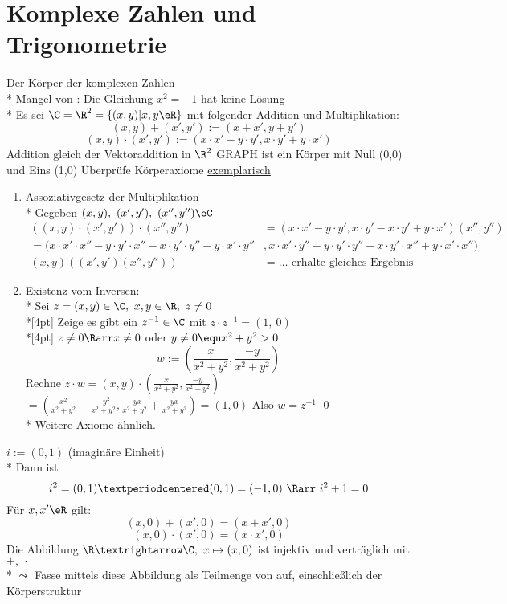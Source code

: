 \chapter{Komplexe Zahlen und Trigonometrie}
Der Körper \C{} der komplexen Zahlen\\*
Mangel von \R{}: Die Gleichung $x^2=-1$ hat keine Lösung\\*
Es sei $\C=\R^2=\{(x,y)|x,y\eR\}$ mit folgender Addition und Multiplikation:
$$(x,y)+(x',y'):=(x+x',y+y')$$
$$(x,y)·(x',y'):=(x·x'-y·y',x·y'+y·x')$$
Addition gleich der Vektoraddition in $\R^2$ GRAPH
\C{} ist ein Körper mit Null (0,0) und Eins (1,0)
\bew
Überprüfe Körperaxiome \ul{exemplarisch}
\begin{enumerate}
\item{Assoziativgesetz der Multiplikation\\*
Gegeben $(x,y),\ (x',y'),\ (x'',y'')\eC$
\begin{align*}
((x,y)·(x',y'))·(x'',y'')&=(x·x'-y·y',x·y'-x·y'+y·x')(x'',y'')\\
=(x·x'·x''-y·y'·x''-x·y'·y''-y·x'·y''&,x·x'·y''-y·y'·y''+x·y'·x''+y·x'·x'')\\
(x,y)((x',y')(x'',y''))&=…\text{ erhalte gleiches Ergebnis}
\end{align*}}
\item{Existenz vom Inversen:\\*
Sei $z = (x, y) \in \C, \ x, y \in \R, \ z \neq 0$ \\*[4pt]
Zeige es gibt ein $z^{-1} \in \C$ mit $z \cdot z^{-1} = (1,\ 0)$\\*[4pt]
$z \neq 0 \Rarr x \neq 0$ oder $y \neq 0 \equ x^2 + y^2 > 0$
$$w:= \left(\frac{x}{x^2 + y^2}, \frac{-y}{x^2 + y^2}\right)$$
Rechne $z \cdot w = (x, y) \cdot \left(\frac{x}{x^2 + y^2}, \frac{-y}{x^2 + y^2}\right)$
$=\left(\frac{x^2}{x^2 + y^2} - \frac{-y^2}{x^2 + y^2}, \frac{-yx}{x^2 + y^2} + \frac{yx}{x^2 + y^2}\right) = (1, 0)$
Also $w = z^{-1}$ \qed \\*
Weitere Axiome ähnlich.}
\end{enumerate}
$i:=(0,1)$ (imaginäre Einheit)\\*
Dann ist $$i^2=(0,1)·(0,1)=(-1,0)\ \Rarr\ i^2+1=0$$
\bem
Für $x,x'\eR$ gilt:
$$(x,0)+(x',0)=(x+x',0)$$
$$(x,0)·(x',0)=(x·x',0)$$
Die Abbildung $\R→\C,\ x\mapsto(x,0)$ ist injektiv und verträglich mit $+,\ ·$\\*
$\leadsto$ Fasse \R{} mittels diese Abbildung als Teilmenge von \C{} auf, einschließlich der Körperstruktur\\
